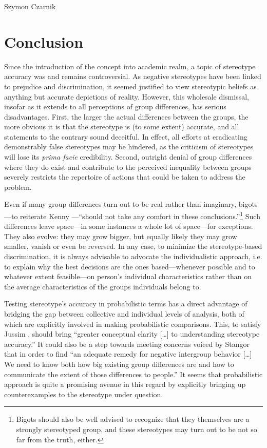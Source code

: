 \begin{artengenv}{Szymon Czarnik}
\section{Conclusion}
Since the introduction of the concept into academic realm, a topic of stereotype accuracy was and remains controversial. As negative stereotypes have been linked to prejudice and discrimination, it seemed justified to view stereotypic beliefs as anything but accurate depictions of reality. However, this wholesale dismissal, insofar as it extends to all perceptions of group differences, has serious disadvantages. First, the larger the actual differences between the groups, the more obvious it is that the stereotype is (to some extent) accurate, and all statements to the contrary sound deceitful. In effect, all efforts at eradicating demonstrably false stereotypes may be hindered, as the criticism of stereotypes will lose its \textit{prima facie} credibility. Second, outright denial of group differences where they do exist and contribute to the perceived inequality between groups severely restricts the repertoire of actions that could be taken to address the problem.

Even if many group differences turn out to be real rather than imaginary, bigots—to reiterate Kenny
\parencite[][p.212]{kenny_interpersonal_1994}%
—``should not take any comfort in these conclusions.''\footnote{Bigots should also be well advised to recognize that they themselves are a strongly stereotyped group, and these stereotypes may turn out to be not so far from the truth, either. } Such differences leave space—in some instances a whole lot of space—for exceptions. They also evolve: they may grow bigger, but equally likely they may grow smaller, vanish or even be reversed. In any case, to minimize the stereotype-based discrimination, it is always advisable to advocate the individualistic approach, i.e. to explain why the best decisions are the ones based—whenever possible and to whatever extent feasible—on person's individual characteristics rather than on the average characteristics of the groups individuals belong to.

Testing stereotype's accuracy in probabilistic terms has a direct advantage of bridging the gap between collective and individual levels of analysis, both of which are explicitly involved in making probabilistic comparisons. This, to satisfy Jussim
\parencite*[][p.309]{jussim_social_2012}, %
 should bring ``greater conceptual clarity […] to understanding stereotype accuracy.'' It could also be a step towards meeting concerns voiced by Stangor 
\parencite*[][p.278]{lee_content_1995} %
 that in order to find ``an adequate remedy for negative intergroup behavior […] We need to know both how big existing group differences are and how to communicate the extent of those differences to people.'' It seems that probabilistic approach is quite a promising avenue in this regard by explicitly bringing up counterexamples to the stereotype under question.


\end{artengenv}
